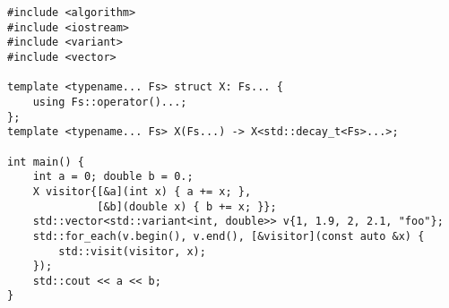\begin{lstlisting}[title=\href{https://godbolt.org/z/2vDNfD}{\texttt{godbolt.org/z/2vDNfD}}]
#include <algorithm>
#include <iostream>
#include <variant>
#include <vector>

template <typename... Fs> struct X: Fs... {
    using Fs::operator()...;
};
template <typename... Fs> X(Fs...) -> X<std::decay_t<Fs>...>;

int main() {
    int a = 0; double b = 0.;
    X visitor{[&a](int x) { a += x; },
              [&b](double x) { b += x; }};
    std::vector<std::variant<int, double>> v{1, 1.9, 2, 2.1, "foo"};
    std::for_each(v.begin(), v.end(), [&visitor](const auto &x) {
        std::visit(visitor, x);
    });
    std::cout << a << b;
}
\end{lstlisting}
